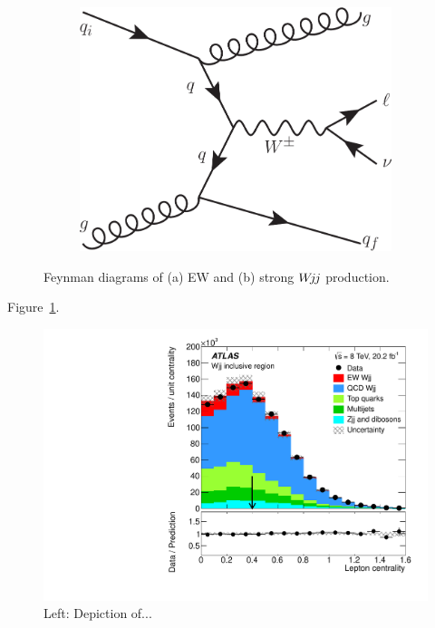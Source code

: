 \documentclass{PoS}
\def\wjj{\ensuremath{W\kern -0.2em j\kern -0.1emj}\xspace}
\begin{document}
\begin{figure}[t!]
\begin{subfigure}[t]{0.26\textwidth}
    \includegraphics[width=.99\textwidth]{STDM-2014-11/fig_02b.pdf}
    \caption{}
  \end{subfigure}
  \caption{Feynman diagrams of (a) EW and (b) strong \wjj production.}
\end{figure}

Figure~\ref{wjj-cartoons}.

\begin{figure}
\centering
{}
\includegraphics[width=.44\textwidth]{STDM-2014-11/fig_05b.pdf}
  \caption{Left: Depiction of...}
  \label{wjj-cartoons}
\end{figure}

\end{document}
